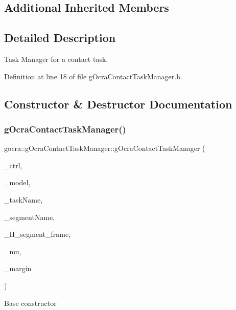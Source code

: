 \subsection*{Additional Inherited Members}


\subsection{Detailed Description}
Task Manager for a contact task. 



Definition at line 18 of file g\+Ocra\+Contact\+Task\+Manager.\+h.



\subsection{Constructor \& Destructor Documentation}
\hypertarget{classgocra_1_1gOcraContactTaskManager_aa35eda0ee0b427b7da1aca284f6da5a8}{}\label{classgocra_1_1gOcraContactTaskManager_aa35eda0ee0b427b7da1aca284f6da5a8} 
\subsubsection{\texorpdfstring{g\+Ocra\+Contact\+Task\+Manager()}{gOcraContactTaskManager()}}
{\footnotesize\ttfamily gocra\+::g\+Ocra\+Contact\+Task\+Manager\+::g\+Ocra\+Contact\+Task\+Manager (\begin{DoxyParamCaption}\item[{\hyperlink{classgocra_1_1GHCJTController}{G\+H\+C\+J\+T\+Controller} \&}]{\+\_\+ctrl,  }\item[{const ocra\+::\+Model \&}]{\+\_\+model,  }\item[{const std\+::string \&}]{\+\_\+task\+Name,  }\item[{const std\+::string \&}]{\+\_\+segment\+Name,  }\item[{Eigen\+::\+Displacementd}]{\+\_\+\+H\+\_\+segment\+\_\+frame,  }\item[{double}]{\+\_\+mu,  }\item[{double}]{\+\_\+margin }\end{DoxyParamCaption})}

Base constructor


